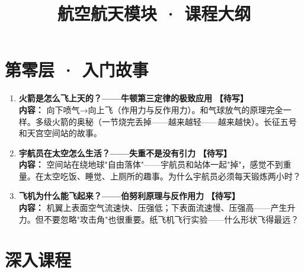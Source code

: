 \documentclass[a4paper,11pt]{ctexart}
\title{\textcolor{blue!70!black}{\Huge\textbf{航空航天模块 · 课程大纲}}}
\author{}
\date{}
\newcommand{\draft}{\textcolor{orange!80!black}{\textbf{【待写】}}}
\begin{document}
\maketitle
\thispagestyle{empty}

\section*{第零层 · 入门故事}

\begin{enumerate}
\item[\textbf{第1课}] \textbf{火箭是怎么飞上天的？——牛顿第三定律的极致应用} \draft \\
\textbf{内容：} 向下喷气→向上飞（作用力与反作用力）。和气球放气的原理完全一样。多级火箭的奥秘（一节烧完丢掉——越来越轻——越来越快）。长征五号和天宫空间站的故事。
\item[\textbf{第2课}] \textbf{宇航员在太空怎么生活？——失重不是没有引力} \draft \\
\textbf{内容：} 空间站在绕地球"自由落体"——宇航员和站体一起"掉"，感觉不到重量。在太空吃饭、睡觉、上厕所的趣事。为什么宇航员必须每天锻炼两小时？
\item[\textbf{第3课}] \textbf{飞机为什么能飞起来？——伯努利原理与反作用力} \draft \\
\textbf{内容：} 机翼上表面空气流速快、压强低；下表面流速慢、压强高——产生升力。但不要忽略"攻击角"也很重要。纸飞机飞行实验——什么形状飞得最远？
\end{enumerate}

\section*{深入课程}
\end{document}
